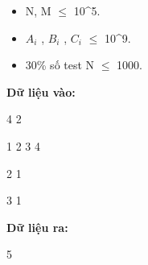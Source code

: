 \begin{itemize}
	\item     N, M  $\le$  10^5.   
	\item     $A_{i}$    , $B_{i}$    , $C_{i}$     $\le$  10^9.   
	\item     30\% số test N  $\le$  1000.   
\end{itemize}
\textbf{    Dữ liệu vào:   }

   4 2  

   1 2 3 4  

   2 1  

   3 1  

\textbf{    Dữ liệu ra:   }

   5